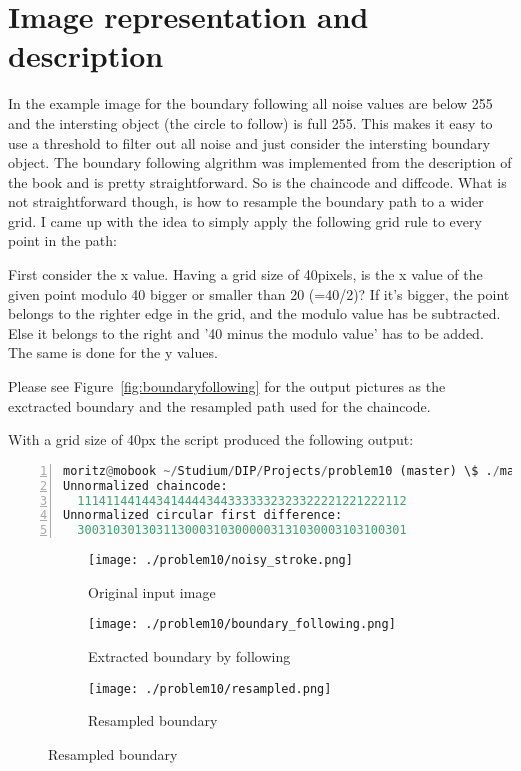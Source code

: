 \documentclass[a4paper]{scrartcl}
\begin{document}
\section{Image representation and description}

In the example image for the boundary following all noise values are below 255 and the intersting object (the circle to follow) is full 255. This makes it easy to use a threshold to filter out all noise and just consider the intersting boundary object.
The boundary following algrithm was implemented from the description of the book and is pretty straightforward. So is the chaincode and diffcode.
What is not straightforward though, is how to resample the boundary path to a wider grid. I came up with the idea to simply apply the following grid rule to every point in the path:

First consider the x value. Having a grid size of 40pixels, is the x value of the given point modulo 40 bigger or smaller than 20 (=40/2)? If it's bigger, the point belongs to the righter edge in the grid, and the modulo value has be subtracted. Else it belongs to the right and '40 minus the modulo value' has to be added.
The same is done for the y values.

Please see Figure~\ref{fig:boundaryfollowing} for the output pictures as the exctracted boundary and the resampled path used for the chaincode.

With a grid size of 40px the script produced the following output:

\begin{lstlisting}[frame=single, backgroundcolor=\color{light-gray}, basicstyle=\footnotesize\ttfamily, language=Python, numbers=left, numberstyle=\tiny\color{black},caption= {A desciption of the listing}]
moritz@mobook ~/Studium/DIP/Projects/problem10 (master) \$ ./main.py
Unnormalized chaincode:
  1114114414434144443443333332323322221221222112
Unnormalized circular first difference:
  3003103013031130003103000003131030003103100301
\end{lstlisting}

\begin{figure}[H]
  \centering
  \caption{Boundary Following}
  \label{fig:boundaryfollowing}
  \begin{subfigure}[t]{0.3\textwidth}
    \texttt{[image: ./problem10/noisy\_stroke.png]}
    \caption{Original input image}
  \end{subfigure}
  \begin{subfigure}[t]{0.3\textwidth}
    \texttt{[image: ./problem10/boundary\_following.png]}
    \caption{Extracted boundary by following}
  \end{subfigure}
  \begin{subfigure}[t]{0.3\textwidth}
    \texttt{[image: ./problem10/resampled.png]}
    \caption{Resampled boundary}
  \end{subfigure}
\end{figure}
\end{document}
